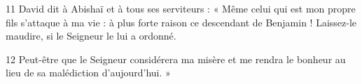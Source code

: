 
11 David dit à Abishaï et à tous ses serviteurs : « Même celui qui est mon propre fils s’attaque à ma vie : à plus forte raison ce descendant de Benjamin ! Laissez-le maudire, si le Seigneur le lui a ordonné.

12 Peut-être que le Seigneur considérera ma misère et me rendra le bonheur au lieu de sa malédiction d’aujourd’hui. »